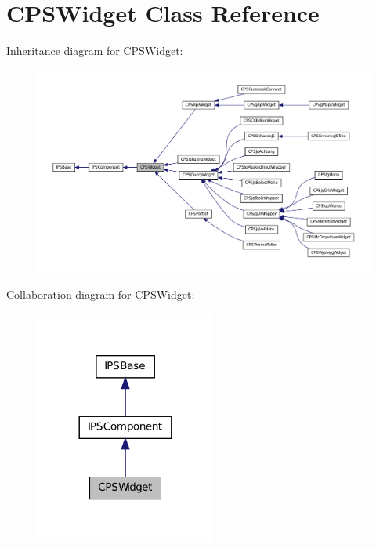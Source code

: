 \hypertarget{classCPSWidget}{
\section{CPSWidget Class Reference}
\label{classCPSWidget}
}


Inheritance diagram for CPSWidget:\nopagebreak
\begin{figure}[H]
\begin{center}
\leavevmode
\includegraphics[width=400pt]{classCPSWidget__inherit__graph}
\end{center}
\end{figure}


Collaboration diagram for CPSWidget:\nopagebreak
\begin{figure}[H]
\begin{center}
\leavevmode
\includegraphics[width=168pt]{classCPSWidget__coll__graph}
\end{center}
\end{figure}

